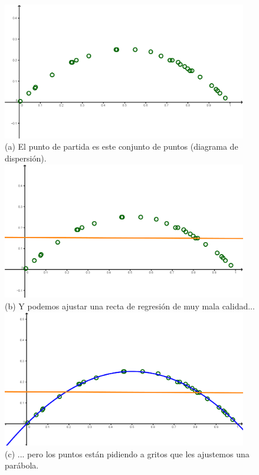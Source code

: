 \begin{ejemplo}
\begin{figure}[p]
\begin{center}
\begin{enColor}
\includegraphics[height=6cm]{../fig/Cap10-EjemploRectaMalaAproximacion01a.png}\\
(a) El punto de partida es este conjunto de puntos (diagrama de dispersi\'on).\\
\includegraphics[height=6cm]{../fig/Cap10-EjemploRectaMalaAproximacion01b.png}\\
(b) Y podemos ajustar una recta de regresi\'on de muy mala calidad...
\includegraphics[height=6cm]{../fig/Cap10-EjemploRectaMalaAproximacion01c.png}\\
(c) ... pero los puntos est\'an pidiendo a gritos que les ajustemos una par\'abola.
\end{enColor}

\end{center}
\end{figure}
\end{ejemplo}
